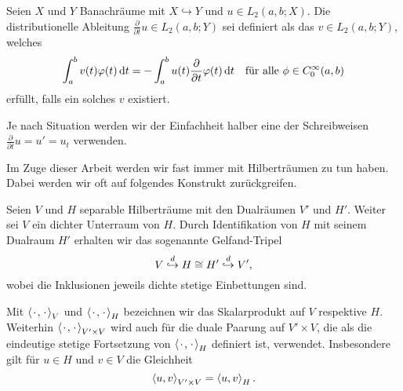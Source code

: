 \begin{Definition}
\label{definition:gl:schwache_zeitableitung}
    Seien $X$ und $Y$ Banachräume mit $X \hookrightarrow Y$ und $u \in L_{2}(a, b; X)$.
    Die distributionelle Ableitung $\frac{\partial}{\partial t} u \in L_{2}(a, b; Y)$ sei definiert als das $v \in L_{2}(a, b; Y)$, welches
    \begin{equation}
        \int_{a}^{b} v(t) \varphi(t) \diff t = - \int_{a}^{b} u(t) \frac{\partial}{\partial t} \varphi(t) \diff t \quad \fa \phi \in C^{\infty}_{0}(a, b)
    \end{equation}
    erfüllt, falls ein solches $v$ existiert.
\end{Definition}

\begin{Bemerkung*}
    Je nach Situation werden wir der Einfachheit halber eine der Schreibweisen $\frac{\partial}{\partial t} u = u' = u_{t}$ verwenden.
\end{Bemerkung*}

Im Zuge dieser Arbeit werden wir fast immer mit Hilberträumen zu tun haben.
Dabei werden wir oft auf folgendes Konstrukt zurückgreifen.

\begin{Definition}
\label{definition:gl:gelfand_tripel}
    Seien $V$ und $H$ separable Hilberträume mit den Dualräumen $V'$ und $H'$.
    Weiter sei $V$ ein dichter Unterraum von $H$.
    Durch Identifikation von $H$ mit seinem Dualraum $H'$ erhalten wir das sogenannte Gelfand-Tripel
    \begin{equation}
        V \denseinclusion H \cong H' \denseinclusion V',
    \end{equation}
    wobei die Inklusionen jeweils dichte stetige Einbettungen sind.
\end{Definition}

\begin{Bemerkung*}
    Mit $\skprod{\blank}{\blank}_{V}$ und $\skprod{\blank}{\blank}_{H}$ bezeichnen wir das Skalarprodukt auf $V$ respektive $H$.
    Weiterhin $\skprod{\blank}{\blank}_{V' \times V}$ wird auch für die duale Paarung auf $V' \times V$, die als die eindeutige stetige Fortsetzung von $\skprod{\blank}{\blank}_{H}$ definiert ist, verwendet.
    Insbesondere gilt für $u \in H$ und $v \in V$ die Gleichheit
    \begin{equation}
        \skprod{u}{v}_{V' \times V} = \skprod{u}{v}_{H}.
    \end{equation}
\end{Bemerkung*}

